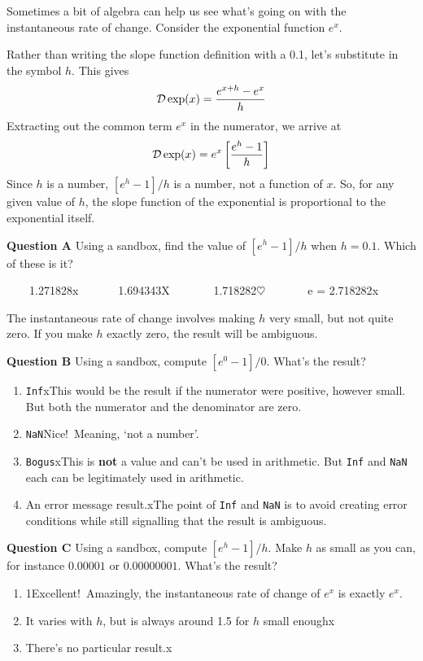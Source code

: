 \documentclass[
  letterpaper,
  DIV=11,
  numbers=noendperiod,
  oneside]{article}
\providecommand{\tightlist}{%
  \setlength{\itemsep}{0pt}\setlength{\parskip}{0pt}}\usepackage{longtable,booktabs,array}
\begin{document}
\begin{multicols}{2}
Sometimes a bit of algebra can help us see what's going on with the
instantaneous rate of change. Consider the exponential function \(e^x\).

Rather than writing the slope function definition with a 0.1, let's
substitute in the symbol \(h\). This gives
\[{\cal D}\exp(x) = \frac{e^{x+h} - e^x}{h}\] Extracting out the common
term \(e^x\) in the numerator, we arrive at
\[{\cal D}\exp(x) = e^x \left[\frac{e^h - 1}{h}\right]\] Since \(h\) is
a number, \([e^h - 1]/h\) is a number, not a function of \(x\). So, for
any given value of \(h\), the slope function of the exponential is
proportional to the exponential itself.

\textbf{Question A} Using a sandbox, find the value of \([e^h - 1]/h\)
when \(h=0.1\). Which of these is it?

~~~~{1.271828{x}}~~~~~~~{1.694343{︎X
}}~~~~~~~{1.718282{\(\heartsuit\ \)}}~~~~~~~{e = 2.718282{x}}

The instantaneous rate of change involves making \(h\) very small, but
not quite zero. If you make \(h\) exactly zero, the result will be
ambiguous.

\textbf{Question B} Using a sandbox, compute \([e^0 - 1]/0\). What's the
result?

\begin{enumerate}
\def\labelenumi{\roman{enumi}.}
\tightlist
\item
  {\texttt{Inf}{xThis would be the result if the numerator were
  positive, however small. But both the numerator and the denominator
  are zero.}}\\
\item
  {\texttt{NaN}{Nice!~Meaning, `not a number'.}}\\
\item
  {\texttt{Bogus}{xThis is \textbf{not} a value and can't be used in
  arithmetic. But \texttt{Inf} and \texttt{NaN} each can be legitimately
  used in arithmetic.}}\\
\item
  {An error message result.{xThe point of \texttt{Inf} and
  \texttt{NaN} is to avoid creating error conditions while still
  signalling that the result is ambiguous.}}
\end{enumerate}

\textbf{Question C} Using a sandbox, compute \([e^h - 1]/h\). Make \(h\)
as small as you can, for instance \(0.00001\) or \(0.00000001\). What's
the result?

\begin{enumerate}
\def\labelenumi{\roman{enumi}.}
\tightlist
\item
  {1{Excellent!~Amazingly, the instantaneous rate of change of \(e^x\)
  is exactly \(e^x\).}}\\
\item
  {It varies with \(h\), but is always around 1.5 for \(h\) small
  enough{x}}\\
\item
  {There's no particular result.{x}}
\end{enumerate}


\end{multicols}
\end{document}
